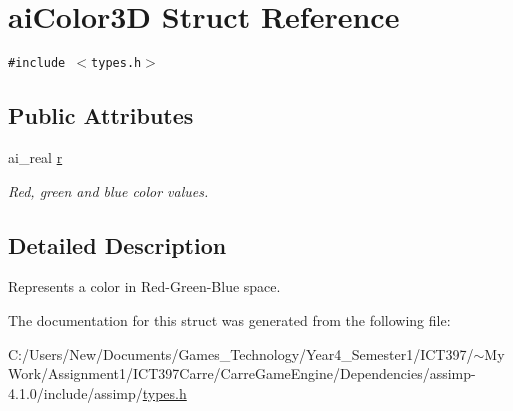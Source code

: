 \hypertarget{structai_color3_d}{
\section{aiColor3D Struct Reference}
\label{structai_color3_d}
}
{\tt \#include $<$types.h$>$}

\subsection*{Public Attributes}
\begin{CompactItemize}
\item 
\hypertarget{structai_color3_d_9244c589dc4c8d95e4107951f2a9a386}{
ai\_\-real \hyperlink{structai_color3_d_9244c589dc4c8d95e4107951f2a9a386}{r}}
\label{structai_color3_d_9244c589dc4c8d95e4107951f2a9a386}

\begin{CompactList}\small\item\em Red, green and blue color values. \item\end{CompactList}\end{CompactItemize}


\subsection{Detailed Description}
Represents a color in Red-Green-Blue space. 

The documentation for this struct was generated from the following file:\begin{CompactItemize}
\item 
C:/Users/New/Documents/Games\_\-Technology/Year4\_\-Semester1/ICT397/$\sim$My Work/Assignment1/ICT397Carre/CarreGameEngine/Dependencies/assimp-4.1.0/include/assimp/\hyperlink{types_8h}{types.h}\end{CompactItemize}
